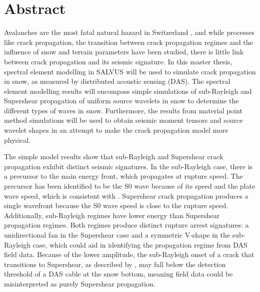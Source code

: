 \chapter*{Abstract}

%

Avalanches are the most fatal natural hazard in Switzerland \parencite{LongtermStatistics}, and while processes like crack propagation, the transition between crack propagation regimes and the influence of snow and terrain parameters have been studied, there is little link between crack propagation and its seismic signature. In this master thesis, spectral element modelling in SALVUS will be used to simulate crack propagation in snow, as measured by distributed acoustic sensing (DAS). The spectral element modelling results will encompass simple simulations of sub-Rayleigh and Supershear propagation of uniform source wavelets in snow to determine the different types of waves in snow. Furthermore, the results from material point method simulations will be used to obtain seismic moment tensors and source wavelet shapes in an attempt to make the crack propagation model more physical. \par

The simple model results show that sub-Rayleigh and Supershear crack propagation exhibit distinct seismic signatures. In the  sub-Rayleigh case, there is a precursor to the main energy front, which propagates at rupture speed. The precursor has been identified to be the S0 wave because of its speed and the plate wave speed, which is consistent with \cite{herwijnenSeismicSensorArray2011}. Supershear crack propagation produces a single wavefront because the S0 wave speed is close to the rupture speed. Additionally, sub-Rayleigh regimes have lower energy than Supershear propagation regimes. Both regimes produce distinct rupture arrest signatures: a unidirectional fan in the Supershear case and a symmetric V-shape in the sub-Rayleigh case, which could aid in identifying the propagation regime from DAS field data. Because of the lower amplitude, the sub-Rayleigh onset of a crack that transitions to Supershear, as described by \cite{trottetTransitionSubRayleighAnticrack2022}, may fall below the detection threshold of a DAS cable at the snow bottom, meaning field data could be misinterpreted as purely Supershear propagation. \par 

